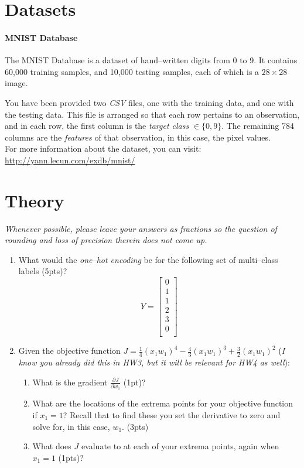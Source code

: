 \documentclass[12pt]{article}
\begin{document}
\newpage
\section*{Datasets}
\paragraph{MNIST Database } 
The MNIST Database is a dataset of hand--written digits from 0 to 9.  It contains 60,000 training samples, and 10,000 testing samples, each of which is a $28\times28$ image.

\noindent
You have been provided two \emph{CSV} files, one with the training data, and one with the testing data.  This file is arranged so that each row pertains to an observation, and in each row, the first column is the \emph{target class} $\in \{0,9\}$.  The remaining 784 columns are the \emph{features} of that observation, in this case, the pixel values.  \\

\noindent
For more information about the dataset, you can visit:  \href{http://yann.lecun.com/exdb/mnist/}{http://yann.lecun.com/exdb/mnist/}


\newpage
\section{Theory}
\emph{Whenever possible, please leave your answers as fractions so the question of rounding and loss of precision therein does not come up.}

\begin{enumerate}
\item What would the \emph{one--hot encoding} be for the following set of multi--class labels (5pts)?
$$Y=\begin{bmatrix}
0\\
1\\
1\\
2\\
3\\
0\\
\end{bmatrix}$$
\item Given the objective function $J=\frac{1}{4}(x_1 w_1)^4-\frac{4}{3}(x_1 w_1)^3+\frac{3}{2}(x_1 w_1)^2$ (\emph{I know you already did this in HW3, but it will be relevant for HW4 as well}):
\begin{enumerate}
\item What is the gradient $\frac{\partial J}{\partial w_1}$ (1pt)?
\item What are the locations of the extrema points for your objective function if $x_1=1$?  Recall that to find these you set the derivative to zero and solve for, in this case, $w_1$. (3pts)
\item What does $J$ evaluate to at each of your extrema points, again when $x_1=1$ (1pts)?
\end{enumerate}

\end{enumerate}
\end{document}
